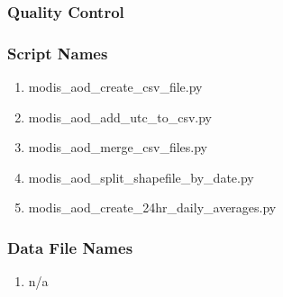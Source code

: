 \subsubsection*{Quality Control}

\subsubsection*{Script Names}

\begin{enumerate}
\item modis\_aod\_create\_csv\_file.py
\item modis\_aod\_add\_utc\_to\_csv.py
\item modis\_aod\_merge\_csv\_files.py
\item modis\_aod\_split\_shapefile\_by\_date.py
\item modis\_aod\_create\_24hr\_daily\_averages.py
\end{enumerate}

\subsubsection*{Data File Names}

\begin{enumerate}
\item n/a
\end{enumerate}